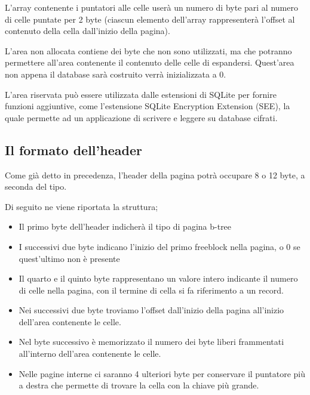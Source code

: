 L’array contenente i puntatori alle celle userà un numero di byte pari al numero di celle puntate per 2 byte (ciascun elemento dell’array rappresenterà l’offset al contenuto della cella dall'inizio della pagina).

L’area non allocata contiene dei byte che non sono utilizzati, ma che potranno permettere all’area contenente il contenuto delle celle di espandersi. Quest’area non appena il database sarà costruito verrà inizializzata a 0. 

L’area riservata può essere utilizzata dalle estensioni di SQLite per fornire funzioni aggiuntive, come l’estensione SQLite Encryption Extension (SEE), la quale permette ad un applicazione di scrivere e leggere su database cifrati.

\newpage

\subsection{Il formato dell’header}

Come già detto in precedenza, l’header della pagina potrà occupare 8 o 12 byte, a seconda del tipo.

\medskip

Di seguito ne viene riportata la struttura;

\begin{itemize}
\item Il primo byte dell’header indicherà il tipo di pagina b-tree

\item I successivi due byte indicano l’inizio del primo freeblock nella pagina, o 0 se quest'ultimo non è presente
\item Il quarto e il quinto byte rappresentano un valore intero indicante il numero di celle nella pagina, con il termine di cella si fa riferimento a un record.
\item Nei successivi due byte troviamo l’offset dall’inizio della pagina all’inizio dell’area contenente le celle.
\item Nel byte successivo è memorizzato il numero dei byte liberi frammentati all’interno dell’area contenente le celle.
\item Nelle pagine interne ci saranno 4 ulteriori byte per conservare il puntatore più a destra che permette di trovare la cella con la chiave più grande.
\end{itemize}

